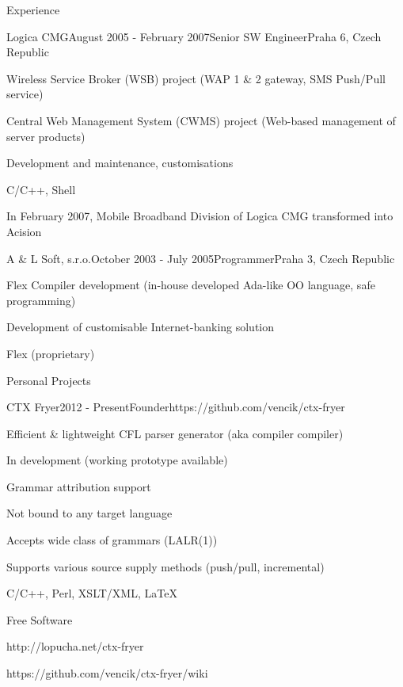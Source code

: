 \documentclass{resume} %
\begin{document}
\begin{rSection}{Experience}

\begin{rSubsection}{Logica CMG}{August 2005 - February 2007}{Senior SW Engineer}{Praha 6, Czech Republic}
\item Wireless Service Broker (WSB) project (WAP 1 \& 2 gateway, SMS Push/Pull service)
\item Central Web Management System (CWMS) project (Web-based management of server products)
\item Development and maintenance, customisations
\item C/C++, Shell
\item In February 2007, Mobile Broadband Division of Logica CMG transformed into Acision
\end{rSubsection}


\begin{rSubsection}{A \& L Soft, s.r.o.}{October 2003 - July 2005}{Programmer}{Praha 3, Czech Republic}
\item Flex Compiler development (in-house developed Ada-like OO language, safe programming)
\item Development of customisable Internet-banking solution
\item Flex (proprietary)
\end{rSubsection}

\end{rSection}


\begin{rSection}{Personal Projects}


\begin{rSubsection}{CTX Fryer}{2012 - Present}{Founder}{https://github.com/vencik/ctx-fryer}
\item Efficient \& lightweight CFL parser generator (aka compiler compiler)
\item In development (working prototype available)
\item Grammar attribution support
\item Not bound to any target language
\item Accepts wide class of grammars (LALR(1))
\item Supports various source supply methods (push/pull, incremental)
\item C/C++, Perl, XSLT/XML, \LaTeX
\item Free Software
\item http://lopucha.net/ctx-fryer
\item https://github.com/vencik/ctx-fryer/wiki
\end{rSubsection}

\end{rSection}
\end{document}

